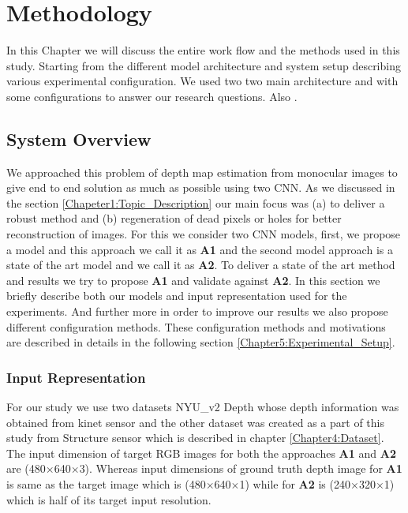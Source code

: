 
\chapter{Methodology}

\label{Chapter5:Methodology} 

In this Chapter we will discuss the entire work flow and the methods used in this study. Starting from the different model architecture and system setup describing various experimental configuration. We used two two main architecture and with some configurations to answer our research questions. Also .


\section{System Overview}
We approached this problem of depth map estimation from monocular images to give end to end solution as much as possible using two CNN. As we discussed in the section \ref{Chapeter1:Topic_Description} our main focus was (a) to deliver a robust method and (b) regeneration of dead pixels or holes for better reconstruction of images. For this we consider two CNN models, first, we propose a model and this approach we call it as \textbf{A1} and the second model approach is a state of the art model and we call it as \textbf{A2}. To deliver a state of the art method and results we try to propose \textbf{A1} and validate against \textbf{A2}. In this section we briefly describe both our models and input representation used for the experiments. And further more in order to improve our results we also propose different configuration methods. These configuration methods and motivations are described in details in the following section \ref{Chapter5:Experimental_Setup}. 


\subsection{Input Representation}
For our study we use two datasets NYU\_v2 Depth \cite{silberman11indoor} whose depth information was obtained from kinet sensor and the other dataset was created as a part of this study from Structure sensor which is described in chapter \ref{Chapter4:Dataset}. The input dimension of target RGB images for both the approaches \textbf{A1} and \textbf{A2} are (480$\times$640$\times$3). Whereas input dimensions of ground truth depth image for \textbf{A1} is same as the target image  which is (480$\times$640$\times$1) while for \textbf{A2} is  (240$\times$320$\times$1) which is half of its target input resolution.


